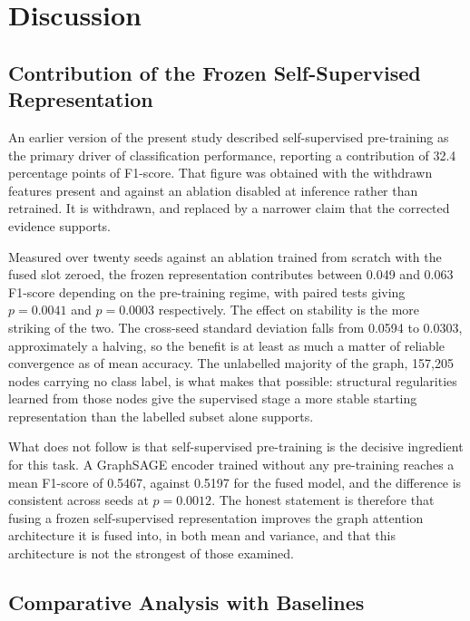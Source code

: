 \documentclass[12pt,a4paper]{article}
\begin{document}
\section{Discussion}
\label{sec:discuss}

\subsection{Contribution of the Frozen Self-Supervised Representation}
\label{sec:dgi_contribution}

An earlier version of the present study described self-supervised
pre-training as the primary driver of classification
performance, reporting a contribution of 32.4 percentage points
of F1-score. That figure was obtained with the withdrawn features
present and against an ablation disabled at inference rather than
retrained. It is withdrawn, and replaced by a narrower claim that
the corrected evidence supports.

Measured over twenty seeds against an ablation trained from
scratch with the fused slot zeroed, the frozen representation
contributes between 0.049 and 0.063 F1-score depending on the
pre-training regime, with paired tests giving $p = 0.0041$ and
$p = 0.0003$ respectively. The effect on stability is the more
striking of the two. The cross-seed standard deviation falls from
0.0594 to 0.0303, approximately a halving, so the benefit is at
least as much a matter of reliable convergence as of mean
accuracy. The unlabelled majority of the graph, 157,205 nodes
carrying no class label, is what makes that possible: structural
regularities learned from those nodes give the supervised stage a
more stable starting representation than the labelled subset
alone supports.

What does not follow is that self-supervised pre-training is the
decisive ingredient for this task. A GraphSAGE encoder trained
without any pre-training reaches a mean F1-score of 0.5467,
against 0.5197 for the fused model, and the difference is
consistent across seeds at $p = 0.0012$. The honest statement is
therefore that fusing a frozen self-supervised representation
improves the graph attention architecture it is fused into, in
both mean and variance, and that this architecture is not the
strongest of those examined.

\subsection{Comparative Analysis with Baselines}
\label{sec:baseline_discussion}
\end{document}
